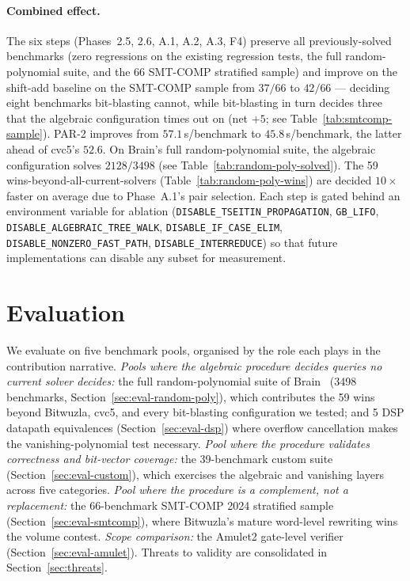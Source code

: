 \documentclass[runningheads]{llncs}
\begin{document}
\paragraph{Combined effect.}
The six steps (Phases~2.5, 2.6, A.1, A.2, A.3, F4) preserve all
previously-solved benchmarks
(zero regressions on the existing regression tests, the
full random-polynomial suite, and the 66 SMT-COMP stratified
sample) and improve on the shift-add baseline on the SMT-COMP
sample from $37/66$ to $42/66$ --- deciding eight benchmarks
bit-blasting cannot, while bit-blasting in turn decides three
that the algebraic configuration times out on (net $+5$; see
Table~\ref{tab:smtcomp-sample}). PAR-2
improves from $57.1$\,s/benchmark to $45.8$\,s/benchmark, the
latter ahead of cvc5's $52.6$. On
Brain's full random-polynomial suite, the algebraic
configuration solves $2128/3498$ (see
Table~\ref{tab:random-poly-solved}). The 59
wins-beyond-all-current-solvers
(Table~\ref{tab:random-poly-wins}) are decided $10\times$
faster on average due to Phase~A.1's pair selection. Each step
is gated behind an environment variable for ablation
(\texttt{DISABLE\_TSEITIN\_PROPAGATION},
\texttt{GB\_LIFO},
\texttt{DISABLE\_ALGEBRAIC\_TREE\_WALK},
\texttt{DISABLE\_IF\_CASE\_ELIM},
\texttt{DISABLE\_NONZERO\_FAST\_PATH},
\texttt{DISABLE\_INTERREDUCE}) so that future implementations
can disable any subset for measurement.

\section{Evaluation}
\label{sec:external}

We evaluate on five benchmark pools, organised by the role each
plays in the contribution narrative. \emph{Pools where the
algebraic procedure decides queries no current solver decides:}
the full random-polynomial suite of
Brain~\cite{brain2025subpoly} (3498 benchmarks, Section~\ref{sec:eval-random-poly}),
which contributes the 59 wins beyond Bitwuzla, cvc5, and every
bit-blasting configuration we tested; and 5 DSP datapath
equivalences (Section~\ref{sec:eval-dsp}) where overflow
cancellation makes the vanishing-polynomial test necessary.
\emph{Pool where the procedure validates correctness and bit-vector
coverage:} the 39-benchmark custom suite
(Section~\ref{sec:eval-custom}), which exercises the algebraic and
vanishing layers across five categories. \emph{Pool where the
procedure is a complement, not a replacement:} the 66-benchmark
SMT-COMP 2024 stratified sample
(Section~\ref{sec:eval-smtcomp}),
where Bitwuzla's mature word-level rewriting wins the volume
contest. \emph{Scope comparison:} the Amulet2 gate-level
verifier (Section~\ref{sec:eval-amulet}). Threats to validity
are consolidated in Section~\ref{sec:threats}.
\end{document}
